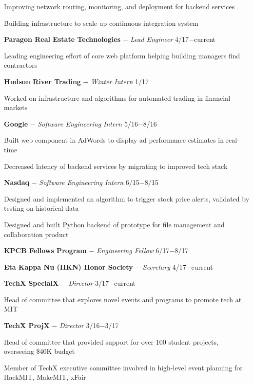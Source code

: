 \documentclass[11pt]{article}
\newcommand{\msection}[1]{\vspace{1em}\marginnote{#1}} %
\newcommand{\bt}[1]{\textbf{#1}} %
\newcommand{\gap}[0]{\vspace{0.7em}} %
\newcommand{\dash}[0]{ $-$ } %
\begin{document}
Improving network routing, monitoring, and deployment for backend services

Building infrastructure to scale up continuous integration system

\gap

\bt{Paragon Real Estate Technologies}\dash \emph{Lead Engineer} \hfill 4/17$-$current

Leading engineering effort of core web platform helping building managers find contractors

\gap

\bt{Hudson River Trading}\dash \emph{Winter Intern} \hfill 1/17

Worked on infrastructure and algorithms for automated trading in financial markets

\gap

\bt{Google}\dash \emph{Software Engineering Intern} \hfill 5/16$-$8/16

Built web component in AdWords to display ad performance estimates in real-time

Decreased latency of backend services by migrating to improved tech stack

\gap

\bt{Nasdaq}\dash \emph{Software Engineering Intern} \hfill 6/15$-$8/15

Designed and implemented an algorithm to trigger stock price alerts, validated by testing on historical data

Designed and built Python backend of prototype for file management and collaboration product



\msection{Leadership}

\bt{KPCB Fellows Program}\dash \emph{Engineering Fellow} \hfill 6/17$-$8/17

\gap

\bt{Eta Kappa Nu (HKN) Honor Society}\dash \emph{Secretary} \hfill 4/17$-$current

\gap

\bt{TechX SpecialX}\dash \emph{Director} \hfill 3/17$-$current

Head of committee that explores novel events and programs to promote tech at MIT

\gap

\bt{TechX ProjX}\dash \emph{Director} \hfill 3/16$-$3/17

Head of committee that provided support for over 100 student projects, overseeing \$40K budget

Member of TechX executive committee involved in high-level event planning for HackMIT, MakeMIT, xFair
\end{document}
